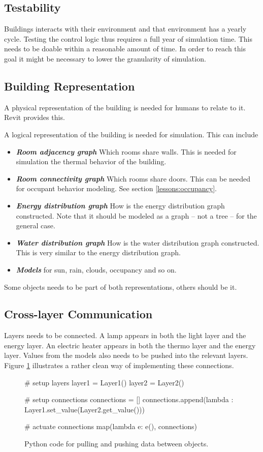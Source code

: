 \documentclass[10pt]{article}
\newcommand{\textdesc}[1]{\textit{\textbf{#1}}} %
\newcommand{\descitem}[1]{\item \textdesc{#1}}
\begin{document}
\subsection{Testability}

Buildings interacts with their environment and that environment has a yearly cycle. Testing the control logic thus requires a full year of simulation time. This needs to be doable within a reasonable amount of time. In order to reach this goal it might be necessary to lower the granularity of simulation.

\subsection{Building Representation}

A physical representation of the building is needed for humans to relate to it. Revit provides this.

A logical representation of the building is needed for simulation. This can include
\begin{itemize}
  \descitem{Room adjacency graph} Which rooms share walls. This is needed for simulation the thermal behavior of the building.
  \descitem{Room connectivity graph} Which rooms share doors. This can be needed for occupant behavior modeling. See section \ref{lessons:occupancy}.
  \descitem{Energy distribution graph} How is the energy distribution graph constructed. Note that it should be modeled as a graph -- not a tree -- for the general case.
  \descitem{Water distribution graph} How is the water distribution graph constructed. This is very similar to the energy distribution graph.
  \descitem{Models} for sun, rain, clouds, occupancy and so on.
\end{itemize}

Some objects needs to be part of both representations, others should be it.

\subsection{Cross-layer Communication}

Layers needs to be connected. A lamp appears in both the light layer and the energy layer. An electric heater appears in both the thermo layer and the energy layer. Values from the models also needs to be pushed into the relevant layers. Figure \ref{fig:lessons:xlayer} illustrates a rather clean way of implementing these connections.

\begin{figure}[htb]
  \begin{center}
\begin{python}
# setup layers
layer1 = Layer1()
layer2 = Layer2()

# setup connections
connections = []
connections.append(lambda : Layer1.set_value(Layer2.get_value()))

# actuate connections
map(lambda e: e(), connections)
\end{python}
  \end{center}
  \caption{Python code for pulling and pushing data between objects.}
  \label{fig:lessons:xlayer}
\end{figure}
\end{document}
